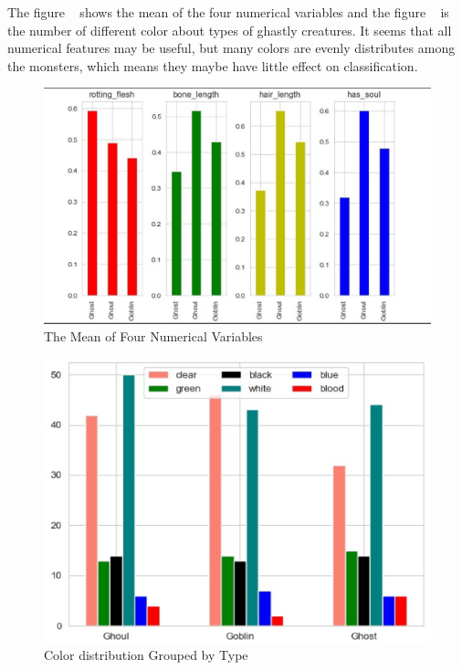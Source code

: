 The figure ~ 
shows the mean of the four numerical variables  
and the figure ~ 
is the number of different color 
about types of ghastly creatures.
It seems that all numerical features may be useful, 
but many colors are evenly distributes among the monsters,
which means they maybe have little effect on classification.


\begin{figure}[htbp]
	\centering
	
	\includegraphics[scale=0.3]{figures/his_1.eps}
	\caption{The Mean of Four Numerical Variables}\label{fig:his_1}
\end{figure}

\begin{figure}[htbp]
	\centering
	
	\includegraphics[scale=0.3]{figures/his_2.eps}
	\caption{Color distribution Grouped by Type}\label{fig:his_2}
\end{figure}

